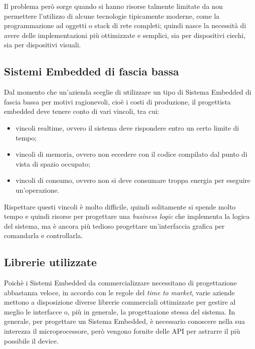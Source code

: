 \documentclass[journal]{IEEEtran}
\begin{document}
Il problema però sorge quando si hanno risorse talmente limitate da non permettere l'utilizzo di alcune tecnologie tipicamente moderne, come la programmazione ad oggetti o stack di rete completi; quindi nasce la necessità di avere delle implementazioni più ottimizzate e semplici, sia per dispositivi ciechi, sia per dispositivi visuali.

\subsection{Sistemi Embedded di fascia bassa}

Dal momento che un'azienda sceglie di utilizzare un tipo di Sistema Embedded di fascia bassa per motivi ragionevoli, cioè i costi di produzione, il progettista embedded deve tenere conto di vari vincoli, tra cui:

\begin{itemize}
\item vincoli realtime, ovvero il sistema deve rispondere entro un certo limite di tempo;
\item vincoli di memoria, ovvero non eccedere con il codice compilato dal punto di vista di spazio occupato;
\item vincoli di consumo, ovvero non si deve consumare troppa energia per eseguire un'operazione.
\end{itemize}

Rispettare questi vincoli è molto difficile, quindi solitamente si spende molto tempo e quindi risorse per progettare una \textit{business logic} che implementa la logica del sistema, ma è ancora più tedioso progettare un'interfaccia grafica per comandarla e controllarla.


\subsection{Librerie utilizzate}

Poichè i Sistemi Embedded da commercializzare necessitano di progettazione abbastanza veloce, in accordo con le regole del \textit{time to market}, varie aziende mettono a disposizione diverse librerie commerciali ottimizzate per gestire al meglio le interfacce o, più in generale, la progettazione stessa del sistema. In generale, per progettare un Sistema Embedded, è necessario conoscere nella sua interezza il microprocessore, però vengono fornite delle API per astrarre il più possibile il device. 
\end{document}
